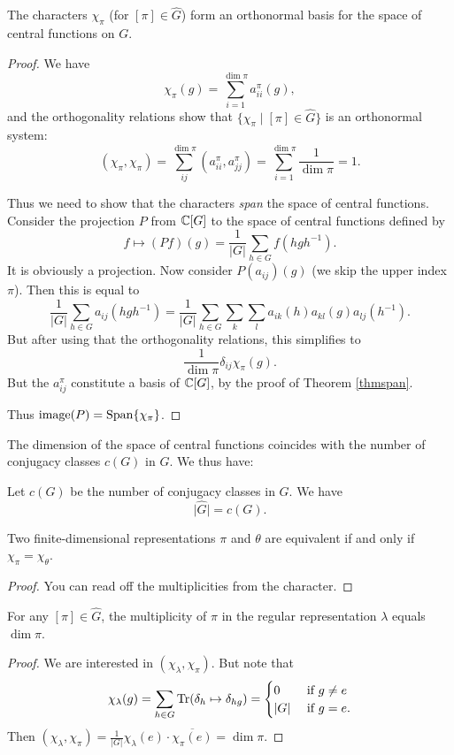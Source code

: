 \documentclass[11pt, english]{article}
\begin{document}
\begin{thm}
 The characters $\chi_\pi$ (for $[\pi] \in \widehat G$) form an orthonormal basis for the space of central functions on $G$.
\end{thm}
\begin{proof}
 We have
$$
\chi_\pi(g) = \sum_{i=1}^{\dim \pi} a_{ii}^\pi(g),
$$
and the orthogonality relations show that $\{ \chi_\pi \mid [\pi] \in \widehat G \}$ is an orthonormal system:
$$
(\chi_\pi, \chi_\pi) = \sum_{ij}^{\dim \pi} (a_{ii}^\pi, a_{jj}^\pi) = 
\sum_{i=1}^{\dim \pi} \frac{1}{\dim \pi} = 1.
$$

Thus we need to show that the characters \emph{span} the space of central functions. Consider the projection $P$ from $\mathbb{C}[G]$ to the space of central functions defined by
$$
f \mapsto (Pf)(g) = \frac{1}{\lvert G \rvert }\sum_{h \in G} f(hgh^{-1}).
$$
It is obviously a projection. Now consider $P(a_{ij})(g)$ (we skip the upper index $\pi$). Then this is equal to
$$
\frac{1}{\lvert G \rvert} \sum_{h \in G} a_{ij}(hgh^{-1}) = \frac{1}{\lvert G \rvert} \sum_{h \in G} \sum_k \sum_l a_{ik}(h) a_{kl}(g) a_{lj}(h^{-1}).
$$
But after using that the orthogonality relations, this simplifies to
$$
\frac{1}{\dim \pi} \delta_{ij} \chi_\pi(g).
$$
But the $a_{ij}^\pi$ constitute a basis of $\mathbb{C}[G]$, by the proof of Theorem \ref{thmspan}.

Thus $\mathrm{image}(P)= \operatorname{Span} \{ \chi_\pi \}$.
\end{proof}

The dimension of the space of central functions coincides with the number of conjugacy classes $c(G)$ in $G$. We thus have:

\begin{corr}
Let $c(G)$ be the number of conjugacy classes in $G$. We have
$$
\lvert \widehat G \rvert = c(G).
$$
\end{corr}



\begin{corr}
 Two finite-dimensional representations $\pi$ and $\theta$ are equivalent if and only if $\chi_\pi = \chi_\theta$.
\end{corr}
\begin{proof}
  You can read off the multiplicities from the character.
\end{proof}

\begin{corr}
 For any $[\pi] \in \widehat G$, the multiplicity of $\pi$ in the regular representation $\lambda$ equals $\dim \pi$.
\end{corr}
\begin{proof}
 We are interested in $(\chi_\lambda, \chi_\pi)$. But note that
$$
\chi_\lambda(g) = \sum_{h \in G} \operatorname{Tr} ( \delta_h \mapsto \delta_{hg} ) = \begin{cases} 0 & \text{ if } g \neq e \\
\lvert G \rvert & \text{ if } g = e.
\end{cases}
$$
Then $(\chi_\lambda,\chi_\pi) = \frac{1}{\lvert G \rvert} \chi_\lambda(e) \cdot \overline{\chi_\pi(e)} = \dim \pi$.
\end{proof}
\end{document}

